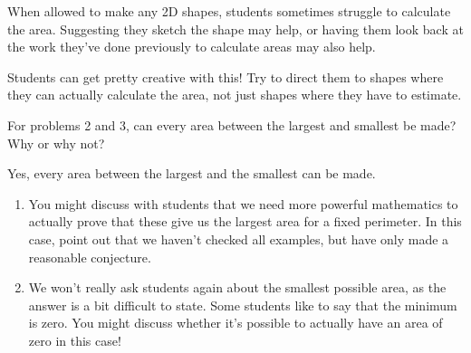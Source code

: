 \documentclass{ximera}
\begin{document}
\begin{problem}
\begin{instructorNotes}
  When allowed to make any 2D shapes, students sometimes struggle to calculate the area.  Suggesting they sketch the shape may help, or having them look back at the work they've done previously to calculate areas may also help.  

Students can get pretty creative with this!  Try to direct them to shapes where they can actually calculate the area, not just shapes where they have to estimate.
\end{instructorNotes}
\end{problem}

\begin{problem} For problems 2 and 3, can every area between the largest and smallest be made?  Why or why not?

\begin{solution}
 Yes, every area between the largest and the smallest can be made.  
\end{solution}

\begin{instructorNotes}
\begin{enumerate}
	\item You might discuss with students that we need more powerful mathematics to actually prove that these give us the largest area for a fixed perimeter.  In this case, point out that we haven't checked all examples, but have only made a reasonable conjecture.
	\item We won't really ask students again about the smallest possible area, as the answer is a bit difficult to state.  Some students like to say that the minimum is zero.  You might discuss whether it's possible to actually have an area of zero in this case!
\end{enumerate}

\end{instructorNotes}
\end{problem}
\end{document}
